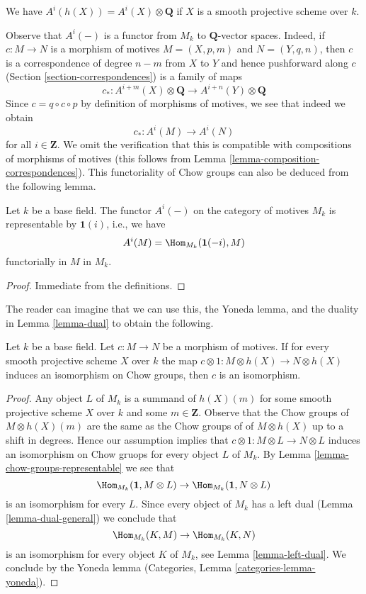 \noindent
We have $A^i(h(X)) = A^i(X) \otimes \mathbf{Q}$
if $X$ is a smooth projective scheme over $k$.

\medskip\noindent
Observe that $A^i(-)$ is a functor from $M_k$ to $\mathbf{Q}$-vector spaces.
Indeed, if $c : M \to N$ is a morphism of motives
$M = (X, p, m)$ and $N = (Y, q, n)$, then $c$ is a correspondence of
degree $n - m$ from $X$ to $Y$ and hence pushforward along $c$
(Section \ref{section-correspondences}) is a family of maps
$$
c_* :
A^{i + m}(X) \otimes \mathbf{Q}
\longrightarrow
A^{i + n}(Y) \otimes \mathbf{Q}
$$
Since $c = q \circ c \circ p$ by definition of morphisms of motives,
we see that indeed we obtain
$$
c_* : A^i(M) \to A^i(N)
$$
for all $i \in \mathbf{Z}$. We omit the verification that this
is compatible with compositions of morphisms of motives (this follows
from Lemma \ref{lemma-composition-correspondences}).
This functoriality of Chow groups can also be deduced from the following
lemma.

\begin{lemma}
\label{lemma-chow-groups-representable}
Let $k$ be a base field. The functor $A^i(-)$ on the category
of motives $M_k$ is representable by $\mathbf{1}(i)$, i.e., we
have
$$
A^i(M) = \Hom_{M_k}(\mathbf{1}(-i), M)
$$
functorially in $M$ in $M_k$.
\end{lemma}

\begin{proof}
Immediate from the definitions.
\end{proof}

\noindent
The reader can imagine that we can use this, the Yoneda lemma, and
the duality in Lemma \ref{lemma-dual} to obtain the following.

\begin{lemma}[Manin]
\label{lemma-manin}
Let $k$ be a base field. Let $c : M \to N$ be a morphism of motives.
If for every smooth projective scheme $X$ over $k$ the map
$c \otimes 1 : M \otimes h(X) \to N \otimes h(X)$ induces an isomorphism on
Chow groups, then $c$ is an isomorphism.
\end{lemma}

\begin{proof}
Any object $L$ of $M_k$ is a summand of $h(X)(m)$ for some smooth projective
scheme $X$ over $k$ and some $m \in \mathbf{Z}$. Observe that the Chow groups
of $M \otimes h(X)(m)$ are the same as the Chow groups of of $M \otimes h(X)$
up to a shift in degrees. Hence our assumption implies
that $c \otimes 1 : M \otimes L \to N \otimes L$ induces an isomorphism on
Chow gruops for every object $L$ of $M_k$. By
Lemma \ref{lemma-chow-groups-representable}
we see that
$$
\Hom_{M_k}(\mathbf{1}, M \otimes L) \to
\Hom_{M_k}(\mathbf{1}, N \otimes L)
$$
is an isomorphism for every $L$. Since every object of $M_k$ has a left dual
(Lemma \ref{lemma-dual-general}) we conclude that
$$
\Hom_{M_k}(K, M) \to \Hom_{M_k}(K, N)
$$
is an isomorphism for every object $K$ of $M_k$, see
Lemma \ref{lemma-left-dual}. We conclude by the Yoneda lemma
(Categories, Lemma \ref{categories-lemma-yoneda}).
\end{proof}




